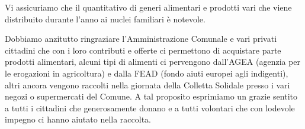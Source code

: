 Vi assicuriamo che il quantitativo di generi alimentari e prodotti vari che viene distribuito durante l’anno ai nuclei familiari è notevole.

Dobbiamo anzitutto ringraziare l’Amministrazione Comunale e vari privati cittadini che con i loro contributi e offerte ci permettono di acquistare parte prodotti alimentari, alcuni tipi di alimenti ci pervengono dall’AGEA (agenzia per le erogazioni in agricoltura) e dalla FEAD (fondo aiuti europei agli indigenti), altri ancora vengono raccolti nella giornata della Colletta Solidale presso i vari negozi o supermercati del Comune. A tal proposito esprimiamo un grazie sentito a tutti i cittadini che generosamente donano e a tutti volontari che con lodevole impegno ci hanno aiutato nella raccolta.


